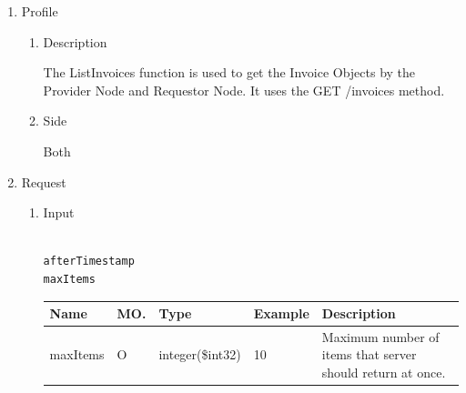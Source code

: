 \newpage



\begin{enumerate}

\item Profile

\begin{enumerate}

\item Description

The ListInvoices function is used to get the Invoice Objects by the Provider Node and Requestor Node. 
It uses the GET /invoices method.
 
\item Side

Both

\end{enumerate}

\item Request

\begin{enumerate}

\item Input

\begin{tcolorbox}[boxrule=0pt, frame empty]
\begin{verbatim}

afterTimestamp
maxItems

\end{verbatim}
\end{tcolorbox}


\begin{table}[H]
\footnotesize

\begin{center}
\begin{tabular}{|p{3cm}|l|p{3cm}|p{3cm}|p{4cm}|} 
\hline
\rowcolor{lightgray}	Name	& MO.	& Type	& Example & 	Description \\
\hline

maxItems				& O	& 	integer(\$int32)	&	10							&	Maximum number of items that server should return at once. \\ 
\hline


\end{tabular}
\end{center}
\end{table}
\end{enumerate}
\end{enumerate}
